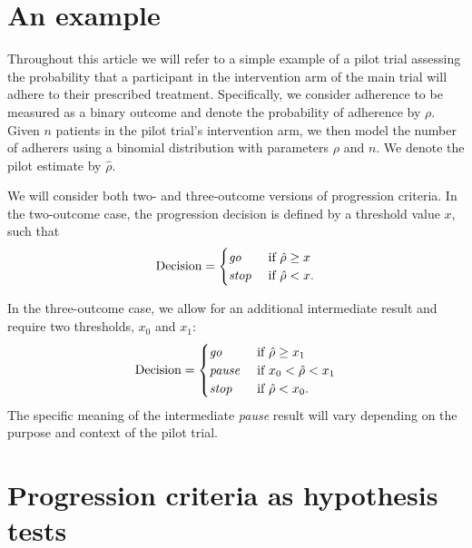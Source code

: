 \documentclass{bmcart}
\begin{document}
\section{An example}\label{sec:example}

Throughout this article we will refer to a simple example of a pilot trial assessing the probability that a participant in the intervention arm of the main trial will adhere to their prescribed treatment. Specifically, we consider adherence to be measured as a binary outcome and denote the probability of adherence by $\rho$. Given  $n$ patients in the pilot trial's intervention arm, we then model the number of adherers using a binomial distribution with parameters $\rho$ and $n$. We denote the pilot estimate by $\hat{\rho}$.

We will consider both two- and three-outcome versions of progression criteria. In the two-outcome case, the progression decision is defined by a threshold value $x$, such that
\begin{equation}\label{eqn:two_outcome}
\text{Decision} = 
\begin{cases}
\text{\emph{go}} & \text{ if } \hat{\rho} \geq x \\
\text{\emph{stop}} & \text{ if } \hat{\rho} < x. \\
\end{cases}
\end{equation}

In the three-outcome case, we allow for an additional intermediate result and require two thresholds, $x_0$ and $x_1$:
\begin{equation}\label{eqn:three_outcome}
\text{Decision} = 
\begin{cases}
\text{\emph{go}} & \text{ if } \hat{\rho} \geq x_1 \\
\text{\emph{pause}} & \text{ if } x_0 < \hat{\rho} < x_1 \\
\text{\emph{stop}} & \text{ if } \hat{\rho} < x_0. \\
\end{cases}
\end{equation}
The specific meaning of the intermediate \emph{pause} result will vary depending on the purpose and context of the pilot trial. 

\section{Progression criteria as hypothesis tests}\label{sec:tests}
\end{document}
